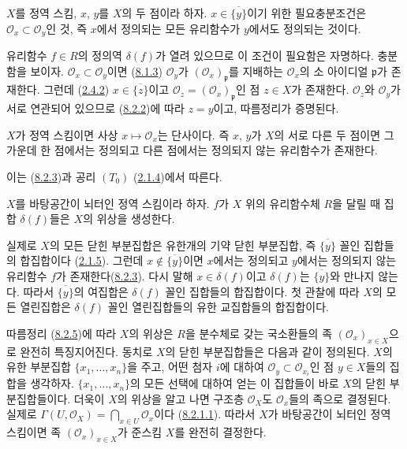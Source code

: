 \begin{corollary}[8.2.3]
\label{I.8.2.3-ko}
$X$를 정역 스킴, $x$, $y$를 $X$의 두 점이라 하자.
$x\in\overline{\{y\}}$이기 위한 필요충분조건은
$\mathscr{O}_x\subset\mathscr{O}_y$인 것, 즉 $x$에서 정의되는 모든
유리함수가 $y$에서도 정의되는 것이다.
\end{corollary}

유리함수 $f\in R$의 정의역 $\delta(f)$가 열려 있으므로 이 조건이
필요함은 자명하다. 충분함을 보이자. $\mathscr{O}_x\subset
\mathscr{O}_y$이면 (\hyperref[I.8.1.3-ko]{8.1.3})
$\mathscr{O}_y$가 $(\mathscr{O}_x)_\mathfrak p$를 지배하는
$\mathscr{O}_x$의 소 아이디얼 $\mathfrak p$가 존재한다. 그런데
(\hyperref[I.2.4.2-ko]{2.4.2})
$x\in\overline{\{z\}}$이고
$\mathscr{O}_z=(\mathscr{O}_x)_\mathfrak p$인 점 $z\in X$가 존재한다.
$\mathscr{O}_z$와 $\mathscr{O}_y$가 서로 연관되어 있으므로
(\hyperref[I.8.2.2-ko]{8.2.2})에 따라 $z=y$이고, 따름정리가 증명된다.

\begin{corollary}[8.2.4]
\label{I.8.2.4-ko}
$X$가 정역 스킴이면 사상 $x\mapsto\mathscr{O}_x$는 단사이다. 즉
$x$, $y$가 $X$의 서로 다른 두 점이면 그 가운데 한 점에서는 정의되고
다른 점에서는 정의되지 않는 유리함수가 존재한다.
\end{corollary}

이는 (\hyperref[I.8.2.3-ko]{8.2.3})과 공리
$(T_0)$ (\hyperref[I.2.1.4-ko]{2.1.4})에서 따른다.

\begin{corollary}[8.2.5]
\label{I.8.2.5-ko}
$X$를 바탕공간이 뇌터인 정역 스킴이라 하자. $f$가 $X$ 위의
유리함수체 $R$을 달릴 때 집합 $\delta(f)$들은 $X$의 위상을 생성한다.
\end{corollary}

실제로 $X$의 모든 닫힌 부분집합은 유한개의 기약 닫힌 부분집합, 즉
$\overline{\{y\}}$ 꼴인 집합들의 합집합이다
(\hyperref[I.2.1.5-ko]{2.1.5}). 그런데
$x\notin\overline{\{y\}}$이면 $x$에서는 정의되고 $y$에서는 정의되지
않는 유리함수 $f$가 존재한다(\hyperref[I.8.2.3-ko]{8.2.3}). 다시
말해 $x\in\delta(f)$이고 $\delta(f)$는 $\overline{\{y\}}$와 만나지
않는다. 따라서 $\overline{\{y\}}$의 여집합은 $\delta(f)$ 꼴인
집합들의 합집합이다. 첫 관찰에 따라 $X$의 모든 열린집합은
$\delta(f)$ 꼴인 열린집합들의 유한 교집합들의 합집합이다.

\begin{env}[8.2.6]
\label{I.8.2.6-ko}
따름정리 (\hyperref[I.8.2.5-ko]{8.2.5})에 따라 $X$의 위상은 $R$을
분수체로 갖는 국소환들의 족 $(\mathscr{O}_x)_{x\in X}$으로 완전히
특징지어진다. 동치로 $X$의 닫힌 부분집합들은 다음과 같이 정의된다.
$X$의 유한 부분집합 $\{x_1,\ldots,x_n\}$을 주고, 어떤 첨자 $i$에
대하여 $\mathscr{O}_y\subset\mathscr{O}_{x_i}$인 점 $y\in X$들의
집합을 생각하자. $\{x_1,\ldots,x_n\}$의 모든 선택에 대하여 얻는
이 집합들이 바로 $X$의 닫힌 부분집합들이다. 더욱이 $X$의 위상을
알고 나면 구조층 $\mathscr{O}_X$도 $\mathscr{O}_x$들의 족으로
결정된다. 실제로
$\Gamma(U,\mathscr{O}_X)=\bigcap_{x\in U}\mathscr{O}_x$이다
(\hyperref[I.8.2.1.1-ko]{8.2.1.1}). 따라서 $X$가 바탕공간이 뇌터인
정역 스킴이면 족 $(\mathscr{O}_x)_{x\in X}$가 준스킴 $X$를 완전히
결정한다.
\end{env}

